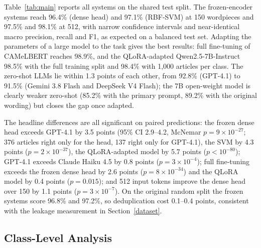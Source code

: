 \documentclass[preprint,12pt,authoryear]{elsarticle}
\newif\ifrevmarkup
\DeclareRobustCommand{\rev}[1]{\ifrevmarkup{\color{blue}#1}\else#1\fi}
\newcommand{\revblock}{\ifrevmarkup\color{blue}\fi}
\begin{document}
\rev{Table~\ref{tab:main} reports all systems on the shared test split. The frozen-encoder systems reach 96.4\% (dense head) and 97.1\% (RBF-SVM) at 150 wordpieces and 97.5\% and 98.1\% at 512, with narrow confidence intervals and near-identical macro precision, recall and F1, as expected on a balanced test set. Adapting the parameters of a large model to the task gives the best results: full fine-tuning of CAMeLBERT reaches 98.9\%, and the QLoRA-adapted Qwen2.5-7B-Instruct 98.5\% with the full training split and 98.4\% with 1,000 articles per class. The zero-shot LLMs lie within 1.3 points of each other, from 92.8\% (GPT-4.1) to 91.5\% (Gemini 3.8 Flash and DeepSeek V4 Flash); the 7B open-weight model is clearly weaker zero-shot (85.2\% with the primary prompt, 89.2\% with the original wording) but closes the gap once adapted.}

{\revblock}

\rev{The headline differences are all significant on paired predictions: the frozen dense head exceeds GPT-4.1 by 3.5 points (95\% CI 2.9--4.2, McNemar $p=9\times10^{-27}$; 376 articles right only for the head, 137 right only for GPT-4.1), the SVM by 4.3 points ($p=2\times10^{-37}$), the QLoRA-adapted model by 5.7 points ($p<10^{-80}$); GPT-4.1 exceeds Claude Haiku 4.5 by 0.8 points ($p=3\times10^{-4}$); full fine-tuning exceeds the frozen dense head by 2.6 points ($p=8\times10^{-34}$) and the QLoRA model by 0.4 points ($p=0.015$); and 512 input tokens improve the dense head over 150 by 1.1 points ($p=3\times10^{-7}$). On the original random split the frozen systems score 96.8\% and 97.2\%, so deduplication cost 0.1--0.4 points, consistent with the leakage measurement in Section~\ref{dataset}.}

\subsection{Class-Level Analysis}
\label{sec:classes}
\end{document}
